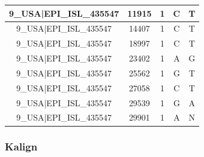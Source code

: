 \documentclass[a4paper,10pt]{article}
\begin{document}
\begin{longtable}{@{}ccccc@{}}
9\_USA|EPI\_ISL\_435547 & 11915 & 1 & C & T \\* \midrule
9\_USA|EPI\_ISL\_435547 & 14407 & 1 & C & T \\* \midrule
9\_USA|EPI\_ISL\_435547 & 18997 & 1 & C & T \\* \midrule
9\_USA|EPI\_ISL\_435547 & 23402 & 1 & A & G \\* \midrule
9\_USA|EPI\_ISL\_435547 & 25562 & 1 & G & T \\* \midrule
9\_USA|EPI\_ISL\_435547 & 27058 & 1 & C & T \\* \midrule
9\_USA|EPI\_ISL\_435547 & 29539 & 1 & G & A \\* \midrule
9\_USA|EPI\_ISL\_435547 & 29901 & 1 & A & N \\* \bottomrule
\end{longtable}

\newpage
\subsubsection{Kalign}
\end{document}
